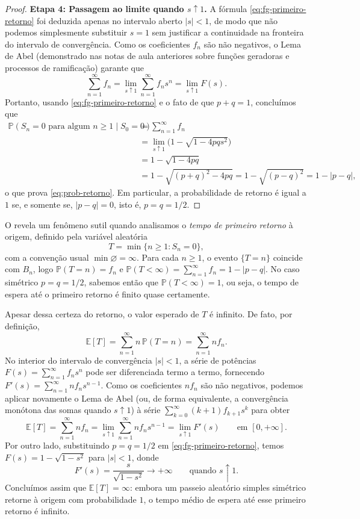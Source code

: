 \documentclass[12pt,portuguese]{article}
\theoremstyle{definition}
\theoremstyle{plainexercise}
\theoremstyle{starredexercise}
\theoremstyle{definition}
\begin{document}
\begin{proof}
\smallskip
\noindent\textbf{Etapa 4: Passagem ao limite quando $s \uparrow 1$.}
A fórmula \eqref{eq:fg-primeiro-retorno} foi deduzida apenas no intervalo
aberto $|s| < 1$, de modo que não podemos simplesmente substituir $s = 1$ sem
justificar a continuidade na fronteira do intervalo de convergência. Como os
coeficientes $f_n$ são não negativos, o Lema de Abel (demonstrado nas notas de
aula anteriores sobre funções geradoras e processos de ramificação) garante que
\[
\sum_{n=1}^{\infty} f_n = \lim_{s \uparrow 1} \sum_{n=1}^{\infty} f_n s^n
= \lim_{s \uparrow 1} F(s).
\]
Portanto, usando \eqref{eq:fg-primeiro-retorno} e o fato de que $p + q = 1$,
concluímos que
\begin{align*}
\mathbb{P}(S_n = 0 \text{ para algum } n \geqslant 1 \mid S_0 = 0)
&= \sum_{n=1}^{\infty} f_n \\[0.3cm]
&= \lim_{s \uparrow 1} \bigl(1 - \sqrt{1 - 4pqs^2}\bigr) \\[0.3cm]
&= 1 - \sqrt{1 - 4pq} \\[0.3cm]
&= 1 - \sqrt{(p + q)^2 - 4pq}
= 1 - \sqrt{(p - q)^2}
= 1 - |p - q|,
\end{align*}
o que prova \eqref{eq:prob-retorno}. Em particular, a probabilidade de retorno
é igual a $1$ se, e somente se, $|p - q| = 0$, isto é, $p = q = 1/2$.
\end{proof}

O  revela um fenômeno sutil quando analisamos o
\emph{tempo de primeiro retorno} à origem, definido pela variável aleatória
\[
T = \min\{n \geqslant 1 : S_n = 0\},
\]
com a convenção usual $\min \varnothing = \infty$. Para cada $n \geqslant 1$, o
evento $\{T = n\}$ coincide com $B_n$, logo $\mathbb{P}(T = n) = f_n$ e
$\mathbb{P}(T < \infty) = \sum_{n=1}^{\infty} f_n = 1 - |p - q|$. No caso
simétrico $p = q = 1/2$, sabemos então que $\mathbb{P}(T < \infty) = 1$, ou
seja, o tempo de espera até o primeiro retorno é finito quase certamente.

Apesar dessa certeza do retorno, o valor esperado de $T$ é infinito. De fato,
por definição,
\[
\mathbb{E}[T] = \sum_{n=1}^{\infty} n\,\mathbb{P}(T = n) = \sum_{n=1}^{\infty} n f_n.
\]
No interior do intervalo de convergência $|s| < 1$, a série de potências
$F(s) = \sum_{n=1}^{\infty} f_n s^n$ pode ser diferenciada termo a termo,
fornecendo $F'(s) = \sum_{n=1}^{\infty} n f_n s^{n-1}$. Como os coeficientes
$n f_n$ são não negativos, podemos aplicar novamente o Lema de Abel (ou, de
forma equivalente, a convergência monótona das somas quando $s \uparrow 1$) à
série $\sum_{k=0}^{\infty} (k + 1) f_{k+1} s^k$ para obter
\[
\mathbb{E}[T]
= \sum_{n=1}^{\infty} n f_n
= \lim_{s \uparrow 1} \sum_{n=1}^{\infty} n f_n s^{n-1}
= \lim_{s \uparrow 1} F'(s)
\qquad\text{em } [0, +\infty].
\]
Por outro lado, substituindo $p = q = 1/2$ em \eqref{eq:fg-primeiro-retorno},
temos $F(s) = 1 - \sqrt{1 - s^2}$ para $|s| < 1$, donde
\[
F'(s) = \frac{s}{\sqrt{1 - s^2}} \to +\infty
\qquad\text{quando } s \uparrow 1.
\]
Concluímos assim que $\mathbb{E}[T] = \infty$: embora um passeio aleatório
simples simétrico retorne à origem com probabilidade $1$, o tempo médio de
espera até esse primeiro retorno é infinito.
\end{document}
